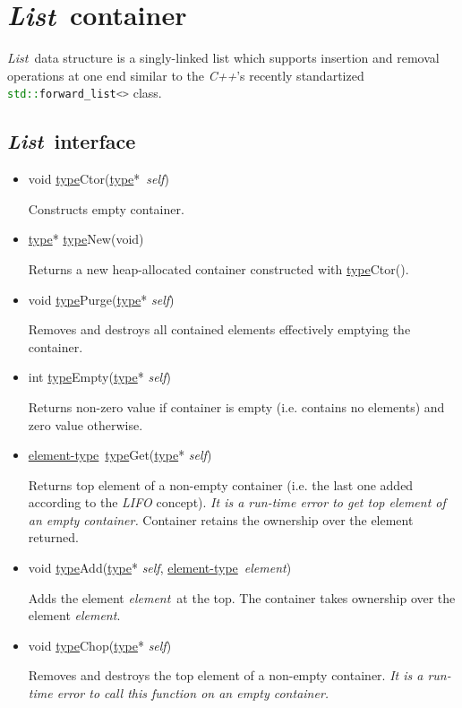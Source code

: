 \documentclass[a4paper]{article}
\newcommand{\Cpp}{\emph{C++}}
\newcommand{\st}{\underline{type}}
\newcommand{\et}{\underline{element-type}}
\newcommand{\sv}{\emph{self}}
\newcommand{\ev}{\emph{element}}
\newcommand{\meth}[1]{#1}
\begin{document}
\newcommand{\List}{\emph{List}}
\section{\List\ container}


\List\ data structure is a singly-linked list which supports insertion and removal operations at one end similar to the \Cpp's recently standartized \lstinline[language=C++]{std::forward_list<>} class.


\subsection{\List\ interface}


\begin{itemize}


\item \meth{void \st Ctor(\st*\ \sv)}


Constructs empty container.


\item \meth{\st* \st New(void)}


Returns a new heap-allocated container constructed with \meth{\st Ctor()}.


\commonmethods


\item \meth{void \st Purge}(\st* \sv)


Removes and destroys all contained elements effectively emptying the container.


\item \meth{int \st Empty}(\st* \sv)


Returns non-zero value if container is empty (i.e. contains no elements) and zero value otherwise.


\item \meth{\et\ \st Get(\st* \sv)}


Returns top element of a non-empty container (i.e. the last one added according to the \emph{LIFO} concept).
\emph{It is a run-time error to get top element of an empty container.}
Container retains the ownership over the element returned.


\item \meth{void \st Add(\st* \sv, \et\ \ev)}


Adds the element \ev\ at the top.
The container takes ownership over the element \ev.


\item \meth{void \st Chop(\st* \sv)}


Removes and destroys the top element of a non-empty container.
\emph{It is a run-time error to call this function on an empty container.}



\end{itemize}
\end{document}
